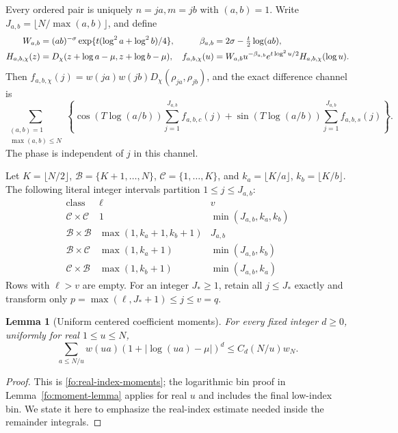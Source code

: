 \documentclass[11pt]{article}
\numberwithin{equation}{section}
\newtheorem{lemma}[theorem]{Lemma}
\theoremstyle{definition}
\theoremstyle{remark}
\begin{document}
Every ordered pair is uniquely $n=ja,m=jb$ with $(a,b)=1$.
Write $J_{a,b}=\lfloor N/\max(a,b)\rfloor$, and define
\begin{align}
 W_{a,b}&=(ab)^{-\sigma}
       \exp\{t(\log^2a+\log^2b)/4\},&
 \beta_{a,b}&=2\sigma-\tfrac t2\log(ab),\notag\\
 H_{a,b,\chi}(z)&=D_\chi(z+\log a-\mu,z+\log b-\mu),&
 f_{a,b,\chi}(u)&=W_{a,b}u^{-\beta_{a,b}}
             e^{t\log^2u/2}H_{a,b,\chi}(\log u).
 \label{em:coefficient}
\end{align}
Then $f_{a,b,\chi}(j)=w(ja)w(jb)D_\chi(\rho_{ja},\rho_{jb})$,
and the exact difference channel is
\[
\sum_{\substack{(a,b)=1\\\max(a,b)\le N}}
\left\{\cos(T\log(a/b))\sum_{j=1}^{J_{a,b}}f_{a,b,c}(j)
      +\sin(T\log(a/b))\sum_{j=1}^{J_{a,b}}f_{a,b,s}(j)\right\}.
\]
The phase is independent of $j$ in this channel.

Let $K=\lfloor N/2\rfloor$, $\mathcal B=\{K+1,\ldots,N\}$,
$\mathcal C=\{1,\ldots,K\}$, and $k_a=\lfloor K/a\rfloor$,
$k_b=\lfloor K/b\rfloor$. The following literal integer intervals
partition $1\le j\le J_{a,b}$:
\[
\begin{array}{c|cc}
\text{class}&\ell&v\\ \hline
\mathcal C\times\mathcal C&1&\min(J_{a,b},k_a,k_b)\\
\mathcal B\times\mathcal B&\max(1,k_a+1,k_b+1)&J_{a,b}\\
\mathcal B\times\mathcal C&\max(1,k_a+1)&\min(J_{a,b},k_b)\\
\mathcal C\times\mathcal B&\max(1,k_b+1)&\min(J_{a,b},k_a)
\end{array}
\]
Rows with $\ell>v$ are empty. For an integer $J_*\ge1$, retain all
$j\le J_*$ exactly and transform only $p=\max(\ell,J_*+1)\le j\le v=q$.

\begin{lemma}[Uniform centered coefficient moments]
\label{em:moment-bound}
For every fixed integer $d\ge0$, uniformly for real $1\le u\le N$,
\[
\sum_{a\le N/u}w(ua)(1+|\log(ua)-\mu|)^d
                      \le C_d (N/u)w_N .
\]
\end{lemma}
\begin{proof}
This is \eqref{fo:real-index-moments}; the logarithmic bin proof in
Lemma~\ref{fo:moment-lemma} applies for real $u$ and includes the final
low-index bin. We state it here to emphasize the real-index estimate
needed inside the remainder integrals.
\end{proof}
\end{document}
